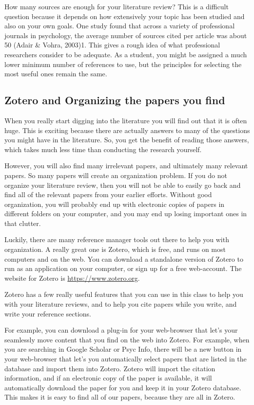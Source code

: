 \documentclass[]{book}
\theoremstyle{definition}
\theoremstyle{definition}
\theoremstyle{remark}
\begin{document}
How many sources are enough for your literature review? This is a
difficult question because it depends on how extensively your topic has
been studied and also on your own goals. One study found that across a
variety of professional journals in psychology, the average number of
sources cited per article was about 50 (Adair \& Vohra, 2003)1. This
gives a rough idea of what professional researchers consider to be
adequate. As a student, you might be assigned a much lower minimum
number of references to use, but the principles for selecting the most
useful ones remain the same.

\subsection{Zotero and Organizing the papers you
find}\label{zotero-and-organizing-the-papers-you-find}

When you really start digging into the literature you will find out that
it is often huge. This is exciting because there are actually answers to
many of the questions you might have in the literature. So, you get the
benefit of reading those answers, which takes much less time than
conducting the research yourself.

However, you will also find many irrelevant papers, and ultimately many
relevant papers. So many papers will create an organization problem. If
you do not organize your literature review, then you will not be able to
easily go back and find all of the relevant papers from your earlier
efforts. Without good organization, you will probably end up with
electronic copies of papers in different folders on your computer, and
you may end up losing important ones in that clutter.

Luckily, there are many reference manager tools out there to help you
with organization. A really great one is Zotero, which is free, and runs
on most computers and on the web. You can download a standalone version
of Zotero to run as an application on your computer, or sign up for a
free web-account. The website for Zotero is
\url{https://www.zotero.org}.

Zotero has a few really useful features that you can use in this class
to help you with your literature reviews, and to help you cite papers
while you write, and write your reference sections.

For example, you can download a plug-in for your web-browser that let's
your seamlessly move content that you find on the web into Zotero. For
example, when you are searching in Google Scholar or Psyc Info, there
will be a new button in your web-browser that let's you automatically
select papers that are listed in the database and import them into
Zotero. Zotero will import the citation information, and if an
electronic copy of the paper is available, it will automatically
download the paper for you and keep it in your Zotero database. This
makes it is easy to find all of our papers, because they are all in
Zotero.
\end{document}
